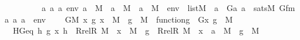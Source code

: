 \begin{isabellebody}
\ \ \ \ \ \ \ \ \ \ {\isachardoublequoteopen}{\isasymAnd}a{}\ a{}\ a{}\ env{\isachardot}{\kern0pt}\ a{}\ {\isasymin}\ M\ {\isasymLongrightarrow}\ a{}\ {\isasymin}\ M\ {\isasymLongrightarrow}\ a{}\ {\isasymin}\ M\ {\isasymLongrightarrow}\ env\ {\isasymin}\ list{\isacharparenleft}{\kern0pt}M{\isacharparenright}{\kern0pt}\ {\isasymLongrightarrow}\ a{}\ {\isacharequal}{\kern0pt}\ G{\isacharparenleft}{\kern0pt}a{}{\isacharcomma}{\kern0pt}\ a{}{\isacharparenright}{\kern0pt}\ {\isasymlongleftrightarrow}\ sats{\isacharparenleft}{\kern0pt}M{\isacharcomma}{\kern0pt}\ Gfm{\isacharcomma}{\kern0pt}\ {\isacharbrackleft}{\kern0pt}a{}{\isacharcomma}{\kern0pt}\ a{}{\isacharcomma}{\kern0pt}\ a{}{\isacharbrackright}{\kern0pt}\ {\isacharat}{\kern0pt}\ env{\isacharparenright}{\kern0pt}{\isachardoublequoteclose}\ \isanewline
\ \ \ GM{\isacharcolon}{\kern0pt}\ {\isachardoublequoteopen}{\isasymAnd}x\ g{\isachardot}{\kern0pt}\ x\ {\isasymin}\ M\ {\isasymLongrightarrow}\ g\ {\isasymin}\ M\ {\isasymLongrightarrow}\ function{\isacharparenleft}{\kern0pt}g{\isacharparenright}{\kern0pt}\ {\isasymLongrightarrow}\ G{\isacharparenleft}{\kern0pt}x{\isacharcomma}{\kern0pt}\ g{\isacharparenright}{\kern0pt}\ {\isasymin}\ M{\isachardoublequoteclose}\ \ \isanewline
\ \ \ HGeq{\isacharcolon}{\kern0pt}\ {\isachardoublequoteopen}{\isasymAnd}h\ g\ x{\isachardot}{\kern0pt}\ h\ {\isasymin}\ Rrel{\isacharparenleft}{\kern0pt}R{\isacharcomma}{\kern0pt}\ M{\isacharparenright}{\kern0pt}\ {\isacharminus}{\kern0pt}{\isacharbackquote}{\kern0pt}{\isacharbackquote}{\kern0pt}\ {\isacharbraceleft}{\kern0pt}x{\isacharbraceright}{\kern0pt}\ {\isasymrightarrow}\ M\ {\isasymLongrightarrow}\ g\ {\isasymin}\ {\isacharparenleft}{\kern0pt}Rrel{\isacharparenleft}{\kern0pt}R{\isacharcomma}{\kern0pt}\ M{\isacharparenright}{\kern0pt}\ {\isacharminus}{\kern0pt}{\isacharbackquote}{\kern0pt}{\isacharbackquote}{\kern0pt}\ {\isacharbraceleft}{\kern0pt}x{\isacharbraceright}{\kern0pt}\ {\isasymtimes}\ {\isacharbraceleft}{\kern0pt}a{\isacharbraceright}{\kern0pt}{\isacharparenright}{\kern0pt}\ {\isasymrightarrow}\ M\ {\isasymLongrightarrow}\ g\ {\isasymin}\ M\ \ \isanewline

\end{isabellebody}
